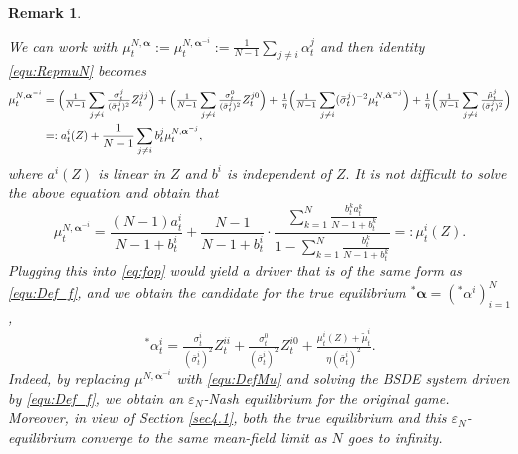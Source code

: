 \documentclass[10pt,a4paper]{article}
\newcommand{\be}{\begin{equation}}
\newcommand{\ee}{\end{equation}}
\newcommand{\Balpha}{\boldsymbol{\alpha}}
\theoremstyle{plain}
\newtheorem{Remark}[Theorem]{Remark}
\theoremstyle{definition}
\numberwithin{equation}{section}
\newcommand{\lps}[2]{{}^{#1}\!#2}
\begin{document}
\begin{Remark}\label{rem:NvsN-1}

We can work with $\mu_{t}^{N,\Balpha}:=\mu^{N,\Balpha^{-i}}_t:= \tfrac{1}{N-1} \sum_{j\neq i} \alpha_{t}^{j}$ and then identity \eqref{equ:RepmuN} becomes
\[
\begin{split}
\mu^{N,\Balpha^{-i}}_t & =   \Bigl(\tfrac{1}{N-1}\sum_{j\neq i} \tfrac{\sigma_{t}^{j}}{(\bar{\sigma}_{t}^{j})^{2}}Z_{t}^{jj}\Bigr) + \Bigl(\tfrac{1}{N-1}\sum_{j \neq i} \tfrac{\sigma_{t}^{0}}{(\bar{\sigma}_{t}^{j})^{2}}Z_{t}^{j0}\Bigr) + \tfrac{1}{\eta}\Bigl(\tfrac{1}{N-1}\sum_{j \neq i }(\bar{\sigma}_{t}^{j})^{-2}\mu_{t}^{N, {\hat{\Balpha}}^{-j} } \Bigr)+ \tfrac{1}{\eta}\Bigl(\tfrac{1}{N-1}\sum_{j \neq i} \tfrac{\tilde{\mu}_{t}^{j}}{(\bar{\sigma}_{t}^{j})^{2}}\Bigr)\\
& = :  a^i_t (Z) + \frac{1}{N-1} \sum_{j \neq i} b^j_t \mu^{N,\Balpha^{-j}}_t,
\end{split}
\]
where $a^i(Z)$ is linear in $Z$ and $b^i$ is independent of $Z.$
It is not difficult to solve the above equation and obtain that 
\begin{equation} \label{equ:defrealmu}
\mu^{N,\Balpha^{-i}}_t
=
\frac{(N-1)a_t^i}{N-1+b_t^i}
+
\frac{N-1}{N-1+b_t^i}
\cdot
\frac{\displaystyle \sum_{k=1}^N \frac{b^k_t a^k_t}{N-1+b^k_t}}
{\displaystyle 1-\sum_{k=1}^N \frac{b^k_t}{N-1+b^k_t}}=:\mu^i_t(Z).
\end{equation}
Plugging this into \eqref{eq:fop} would yield a driver that is of the same form as \eqref{equ:Def_f}, and we obtain the candidate for the true equilibrium $\lps{*}\Balpha=(\lps{*}{\alpha}^{i})_{i=1}^N$,
\be\label{eq:trueeq}
\lps{*}{\alpha}_{t}^{i} = \tfrac{\sigma_{t}^{i}}{(\bar{\sigma}_{t}^{i})^{2}}Z_{t}^{ii} + \tfrac{\sigma_{t}^{0}}{(\bar{\sigma}_{t}^{i})^{2}}Z_{t}^{i0} + \tfrac{\mu^i_t(Z) +\tilde{\mu}_{t}^{i}}{\eta(\bar{\sigma}_{t}^{i})^{2}}.
\ee
Indeed, by replacing $\mu^{N,\Balpha^{-i}}$ with \eqref{equ:DefMu} and solving the BSDE system driven by \eqref{equ:Def_f}, we obtain an $\varepsilon_N$-Nash equilibrium for the original game. Moreover, in view of Section \ref{sec4.1}, both the true equilibrium 
and this $\varepsilon_N$-equilibrium converge to the same mean-field limit as $N$ goes to infinity.
    
\end{Remark}

\end{document}
